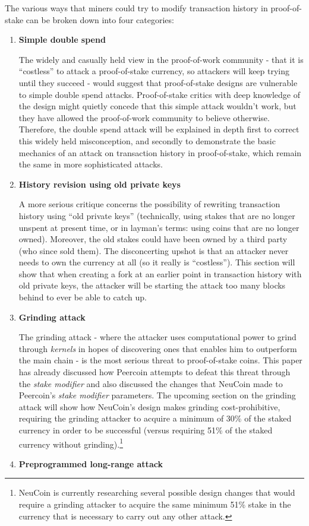 \documentclass[a4paper,11pt]{article}
\begin{document}
The various ways that miners could try to modify transaction history in proof-of-stake can be broken down into four categories:
\begin{enumerate}
\item{\textbf{Simple double spend}

The widely and casually held view in the proof-of-work community - that it is ``costless'' to attack a proof-of-stake currency, so attackers will keep trying until they succeed - would suggest that proof-of-stake designs are vulnerable to simple double spend attacks. Proof-of-stake critics with deep knowledge of the design might quietly concede that this simple attack wouldn't work, but they have allowed the proof-of-work community to believe otherwise. Therefore, the double spend attack will be explained in depth first to correct this widely held misconception, and secondly to demonstrate the basic mechanics of an attack on transaction history in proof-of-stake, which remain the same in more sophisticated attacks. }

\item{\textbf{History revision using old private keys}

A more serious critique concerns the possibility of rewriting transaction history using ``old private keys'' (technically, using stakes that are no longer unspent at present time, or in layman's terms: using coins that are no longer owned). Moreover, the old stakes could have been owned by a third party (who since sold them). The disconcerting upshot is that an attacker never needs to own the currency at all (so it really is ``costless''). This section will show that when creating a fork at an earlier point in transaction history with old private keys, the attacker will be starting the attack too many blocks behind to ever be able to catch up.  }
\item{\textbf{Grinding attack}

The grinding attack - where the attacker uses computational power to grind through \textit{kernels} in hopes of discovering ones that enables him to outperform the main chain - is the most serious threat to proof-of-stake coins. This paper has already discussed how Peercoin attempts to defeat this threat through the \textit{stake modifier} and also discussed the changes that NeuCoin made to Peercoin's \textit{stake modifier} parameters. The upcoming section on the grinding attack will show how NeuCoin's design makes grinding cost-prohibitive, requiring the grinding attacker to acquire a minimum of 30\% of the staked currency in order to be successful (versus requiring 51\% of the staked currency without grinding).\footnote{NeuCoin is currently researching several possible design changes that would require a grinding attacker to acquire the same minimum 51\% stake in the currency that is necessary to carry out any other attack.} }
\item{\textbf{Preprogrammed long-range attack}

}
\end{enumerate}
\end{document}
